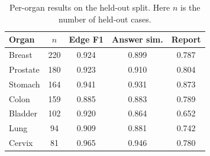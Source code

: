 \begin{table}[t]
\centering
\caption{Per-organ results on the held-out split. Here $n$ is the number of held-out cases.}
\label{tab:organ}
\begin{tabular}{lcccc}
\toprule
Organ & $n$ & Edge F1 & Answer sim. & Report \\
\midrule
Breast & 220 & 0.924 & 0.899 & 0.787 \\
Prostate & 180 & 0.923 & 0.910 & 0.804 \\
Stomach & 164 & 0.941 & 0.931 & 0.873 \\
Colon & 159 & 0.885 & 0.883 & 0.789 \\
Bladder & 102 & 0.920 & 0.864 & 0.652 \\
Lung & 94 & 0.909 & 0.881 & 0.742 \\
Cervix & 81 & 0.965 & 0.946 & 0.780 \\
\bottomrule
\end{tabular}
\end{table}
